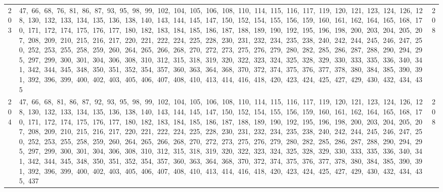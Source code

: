 \begin{longtable}{c|p{}|r}
203 & 47,\ 66,\ 68,\ 76,\ 81,\ 86,\ 87,\ 93,\ 95,\ 98,\ 99,\ 102,\ 104,\ 105,\ 106,\ 108,\ 110,\ 114,\ 115,\ 116,\ 117,\ 119,\ 120,\ 121,\ 123,\ 124,\ 126,\ 128,\ 130,\ 132,\ 133,\ 134,\ 135,\ 136,\ 138,\ 140,\ 143,\ 144,\ 145,\ 147,\ 150,\ 152,\ 154,\ 155,\ 156,\ 159,\ 160,\ 161,\ 162,\ 164,\ 165,\ 168,\ 170,\ 171,\ 172,\ 174,\ 175,\ 176,\ 177,\ 180,\ 182,\ 183,\ 184,\ 185,\ 186,\ 187,\ 188,\ 189,\ 190,\ 192,\ 195,\ 196,\ 198,\ 200,\ 203,\ 204,\ 205,\ 207,\ 208,\ 209,\ 210,\ 215,\ 216,\ 217,\ 220,\ 221,\ 222,\ 224,\ 225,\ 228,\ 230,\ 231,\ 232,\ 234,\ 235,\ 238,\ 240,\ 242,\ 244,\ 245,\ 246,\ 247,\ 250,\ 252,\ 253,\ 255,\ 258,\ 259,\ 260,\ 264,\ 265,\ 266,\ 268,\ 270,\ 272,\ 273,\ 275,\ 276,\ 279,\ 280,\ 282,\ 285,\ 286,\ 287,\ 288,\ 290,\ 294,\ 295,\ 297,\ 299,\ 300,\ 301,\ 304,\ 306,\ 308,\ 310,\ 312,\ 315,\ 318,\ 319,\ 320,\ 322,\ 323,\ 324,\ 325,\ 328,\ 329,\ 330,\ 333,\ 335,\ 336,\ 340,\ 341,\ 342,\ 344,\ 345,\ 348,\ 350,\ 351,\ 352,\ 354,\ 357,\ 360,\ 363,\ 364,\ 368,\ 370,\ 372,\ 374,\ 375,\ 376,\ 377,\ 378,\ 380,\ 384,\ 385,\ 390,\ 391,\ 392,\ 396,\ 399,\ 400,\ 402,\ 403,\ 405,\ 406,\ 407,\ 408,\ 410,\ 413,\ 414,\ 416,\ 418,\ 420,\ 423,\ 424,\ 425,\ 427,\ 429,\ 430,\ 432,\ 434,\ 435 & 208 \\
204 & 47,\ 66,\ 68,\ 81,\ 86,\ 87,\ 92,\ 93,\ 95,\ 98,\ 99,\ 102,\ 104,\ 105,\ 106,\ 108,\ 110,\ 114,\ 115,\ 116,\ 117,\ 119,\ 120,\ 121,\ 123,\ 124,\ 126,\ 128,\ 130,\ 132,\ 133,\ 134,\ 135,\ 136,\ 138,\ 140,\ 143,\ 144,\ 145,\ 147,\ 150,\ 152,\ 154,\ 155,\ 156,\ 159,\ 160,\ 161,\ 162,\ 164,\ 165,\ 168,\ 170,\ 171,\ 172,\ 174,\ 175,\ 176,\ 177,\ 180,\ 182,\ 183,\ 184,\ 185,\ 186,\ 187,\ 188,\ 189,\ 190,\ 192,\ 195,\ 196,\ 198,\ 200,\ 203,\ 204,\ 205,\ 207,\ 208,\ 209,\ 210,\ 215,\ 216,\ 217,\ 220,\ 221,\ 222,\ 224,\ 225,\ 228,\ 230,\ 231,\ 232,\ 234,\ 235,\ 238,\ 240,\ 242,\ 244,\ 245,\ 246,\ 247,\ 250,\ 252,\ 253,\ 255,\ 258,\ 259,\ 260,\ 264,\ 265,\ 266,\ 268,\ 270,\ 272,\ 273,\ 275,\ 276,\ 279,\ 280,\ 282,\ 285,\ 286,\ 287,\ 288,\ 290,\ 294,\ 295,\ 297,\ 299,\ 300,\ 301,\ 304,\ 306,\ 308,\ 310,\ 312,\ 315,\ 318,\ 319,\ 320,\ 322,\ 323,\ 324,\ 325,\ 328,\ 329,\ 330,\ 333,\ 335,\ 336,\ 340,\ 341,\ 342,\ 344,\ 345,\ 348,\ 350,\ 351,\ 352,\ 354,\ 357,\ 360,\ 363,\ 364,\ 368,\ 370,\ 372,\ 374,\ 375,\ 376,\ 377,\ 378,\ 380,\ 384,\ 385,\ 390,\ 391,\ 392,\ 396,\ 399,\ 400,\ 402,\ 403,\ 405,\ 406,\ 407,\ 408,\ 410,\ 413,\ 414,\ 416,\ 418,\ 420,\ 423,\ 424,\ 425,\ 427,\ 429,\ 430,\ 432,\ 434,\ 435,\ 437 & 208 \\

\end{longtable}
